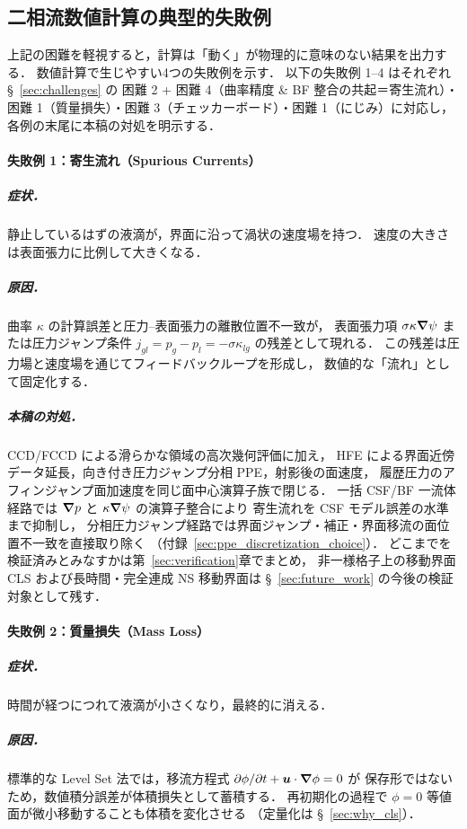 \subsection{二相流数値計算の典型的失敗例}
\label{sec:failure_modes}

上記の困難を軽視すると，計算は「動く」が物理的に意味のない結果を出力する．
数値計算で生じやすい4つの失敗例を示す．
以下の失敗例 1--4 はそれぞれ §~\ref{sec:challenges} の
困難 2 + 困難 4（曲率精度 \& BF 整合の共起＝寄生流れ）・
困難 1（質量損失）・困難 3（チェッカーボード）・困難 1（にじみ）に対応し，
各例の末尾に本稿の対処を明示する．

\paragraph{失敗例 1：寄生流れ（Spurious Currents）}
\subparagraph{症状．}静止しているはずの液滴が，界面に沿って渦状の速度場を持つ．
速度の大きさは表面張力に比例して大きくなる．

\subparagraph{原因．}曲率 $\kappa$ の計算誤差と圧力--表面張力の離散位置不一致が，
表面張力項 $\sigma\kappa\bm{\nabla}\psi$ または圧力ジャンプ条件
$j_{gl}=p_g-p_l=-\sigma\kappa_{lg}$ の残差として現れる．
この残差は圧力場と速度場を通じてフィードバックループを形成し，
数値的な「流れ」として固定化する．

\subparagraph{本稿の対処．}
CCD/FCCD による滑らかな領域の高次幾何評価に加え，
HFE による界面近傍データ延長，向き付き圧力ジャンプ分相 PPE，射影後の面速度，
履歴圧力のアフィンジャンプ面加速度を同じ面中心演算子族で閉じる．
一括 CSF/BF 一流体経路では $\bm{\nabla} p$ と $\kappa\bm{\nabla}\psi$ の演算子整合により
寄生流れを CSF モデル誤差の水準まで抑制し，
分相圧力ジャンプ経路では界面ジャンプ・補正・界面移流の面位置不一致を直接取り除く
（付録~\ref{sec:ppe_discretization_choice}）．
どこまでを検証済みとみなすかは第~\ref{sec:verification}章でまとめ，
非一様格子上の移動界面 CLS および長時間・完全連成 NS 移動界面は
§~\ref{sec:future_work} の今後の検証対象として残す．

\paragraph{失敗例 2：質量損失（Mass Loss）}
\subparagraph{症状．}時間が経つにつれて液滴が小さくなり，最終的に消える．

\subparagraph{原因．}標準的な Level Set 法では，移流方程式
$\partial\phi/\partial t + \bm{u}\cdot\bm{\nabla}\phi=0$ が
保存形ではないため，数値積分誤差が体積損失として蓄積する．
再初期化の過程で $\phi=0$ 等値面が微小移動することも体積を変化させる
（定量化は §~\ref{sec:why_cls}）．

